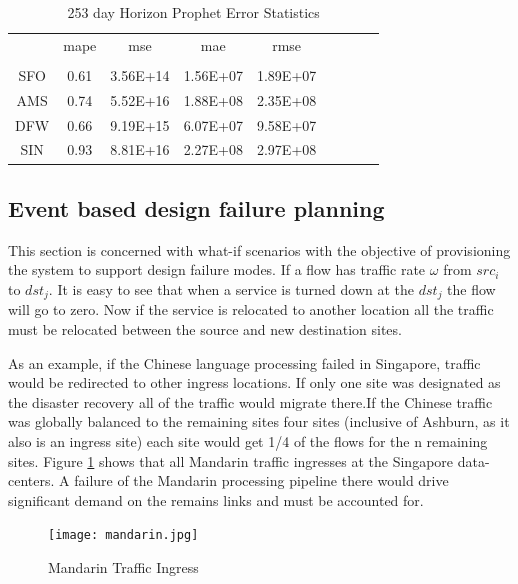 \documentclass[conference]{IEEEtran}
\begin{document}
\begin{tiny}
\begin{table}[htbp]
\caption{253 day Horizon Prophet Error Statistics}
\begin{center}
\begin{tabular}{|c|c|c|c|c|c|c|c|c|}
\hline
{} &     mape &      mse &      mae &     rmse \\
    &          &          &          &          \\
\hline
SFO & 0.61 & 3.56E+14 & 1.56E+07 & 1.89E+07 \\
AMS & 0.74 & 5.52E+16 & 1.88E+08 & 2.35E+08 \\
DFW & 0.66 & 9.19E+15 & 6.07E+07 & 9.58E+07 \\
SIN & 0.93 & 8.81E+16 & 2.27E+08 & 2.97E+08 \\
\hline
\end{tabular}
\label{prophet_err}
\end{center}
\end{table}
\end{tiny}

\subsection{Event based design failure planning}

This section is concerned with what-if scenarios with the objective of provisioning the system to support design failure modes. If a flow has traffic rate $\omega$ from $src_i$ to $dst_j$. It is easy to see that when a service is turned down at the $dst_j$ the flow will go to zero. Now if the service is relocated to another location all the traffic must be relocated between the source and new destination sites. 

As an example, if the Chinese language processing failed in Singapore, traffic would be redirected to other ingress locations. If only one site was designated as the disaster recovery all of the traffic would migrate there.If the Chinese traffic was globally balanced to the remaining sites four sites (inclusive of Ashburn, as it also is an ingress site) each site would get 1/4 of the flows for the n remaining sites. Figure \ref{mandarin} shows that all Mandarin traffic ingresses at the Singapore data-centers. A failure of the Mandarin processing pipeline there would drive significant demand on the remains links and must be accounted for.


\begin{figure}[htbp]
\centering
\texttt{[image: mandarin.jpg]}
\caption{Mandarin Traffic Ingress}
\label{mandarin}
\end{figure}
 
\end{document}
